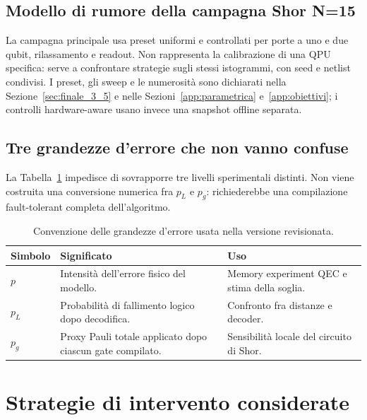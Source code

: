 \subsection{Modello di rumore della campagna Shor N=15}\label{sec:finale_3_3_3}

La campagna principale usa preset uniformi e controllati per porte a uno e due qubit, rilassamento e readout. Non rappresenta la calibrazione di una QPU specifica: serve a confrontare strategie sugli stessi istogrammi, con seed e netlist condivisi. I preset, gli sweep e le numerosità sono dichiarati nella Sezione~\ref{sec:finale_3_5} e nelle Sezioni~\ref{app:parametrica} e~\ref{app:obiettivi}; i controlli hardware-aware usano invece una snapshot offline separata.

\subsection{Tre grandezze d'errore che non vanno confuse}\label{sec:finale_3_3_4}

La Tabella~\ref{tab:finale_3_3} impedisce di sovrapporre tre livelli sperimentali distinti. Non viene costruita una conversione numerica fra $p_L$ e $p_g$: richiederebbe una compilazione fault-tolerant completa dell'algoritmo.

\begin{table}[!htbp]
\centering
\small

\begin{tabularx}{\textwidth}{@{}lXX@{}}
\toprule
\textbf{Simbolo} & \textbf{Significato} & \textbf{Uso} \\
\midrule
$p$ & Intensità dell'errore fisico del modello. & Memory experiment QEC e stima della soglia. \\
\addlinespace[0.3em]
$p_L$ & Probabilità di fallimento logico dopo decodifica. & Confronto fra distanze e decoder. \\
\addlinespace[0.3em]
$p_g$ & Proxy Pauli totale applicato dopo ciascun gate compilato. & Sensibilità locale del circuito di Shor. \\
\bottomrule
\end{tabularx}
\caption{Convenzione delle grandezze d'errore usata nella versione revisionata.}\label{tab:finale_3_3}

\end{table}

\section{Strategie di intervento considerate}\label{sec:finale_3_4}

